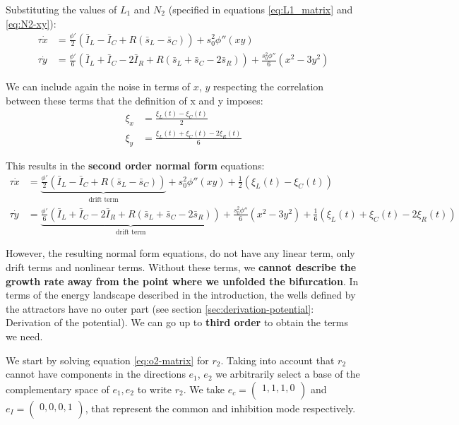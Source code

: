 \documentclass[../main.tex]{subfiles}
\begin{document}
Substituting the values of $L_1$ and $N_2$ (specified in equations \eqref{eq:L1_matrix} and \eqref{eq:N2-xy}): 
\begin{align*}
\tau \dot{x} &= \frac{\phi'}{2}(\bar{I}_L -  \bar{I}_C + R (\bar{s}_L - \bar{s}_C)) + s_0^2\phi''(xy)\\[8pt]
\tau \dot{y} &= \frac{\phi'}{6}(\bar{I}_L +  \bar{I}_C - 2 \bar{I}_R +  R (\bar{s}_L+ \bar{s}_C -2\bar{s}_R) ) + \frac{s_0^2\phi''}{6}(x^2-3y^2) 
\end{align*}

We can include again the noise in terms of $x$, $y$ respecting the correlation between these terms that the definition of x and y imposes:
\[\begin{aligned}
\xi_{x} &= \frac{\xi_{L}(t)-\xi_{C}(t)}{2}\\
\xi_{y} &= \frac{\xi_{L}(t)+\xi_{C}(t)-2\xi_{R}(t)}{6}
\end{aligned}
\]

This results in the \textbf{second order normal form} equations:
\begin{subequations}
\begin{align}
\tau \dot{x} &= \underbrace{\frac{\phi'}{2}(\bar{I}_L -  \bar{I}_C + R (\bar{s}_L - \bar{s}_C))}_{\text{drift term}} + s_0^2\phi''(xy) + \frac{1}{2}(\xi_L(t)-\xi_C(t)) \label{eq:system-o2-x}\\[8pt]
\tau \dot{y} &= \underbrace{\frac{\phi'}{6}(\bar{I}_L +  \bar{I}_C - 2 \bar{I}_R +  R (\bar{s}_L+ \bar{s}_C -2\bar{s}_R) )}_{\text{drift term}} + \frac{s_0^2\phi''}{6}(x^2-3y^2) + \frac{1}{6}(\xi_L(t)+\xi_C(t)-2\xi_R(t))\label{eq:system-o2-y}
\end{align}
\label{eq:system-o2}
\end{subequations}


However, the resulting normal form equations, do not have any linear term, only drift terms and nonlinear terms. Without these terms, we \textbf{cannot describe the growth rate away from the point where we unfolded the bifurcation}. In terms of the energy landscape described in the introduction, the wells defined by the attractors have no outer part (see section \ref{sec:derivation-potential}: Derivation of the potential). We can go up to \textbf{third order} to obtain the terms we need.

We start by solving equation \eqref{eq:o2-matrix} for $r_2$. Taking into account that $r_2$ cannot have components in the directions $e_1$, $e_2$ we arbitrarily select a base of the complementary space of $e_1,e_2$ to write $r_2$. We take $e_c = \begin{pmatrix}
1,1,1,0\\
\end{pmatrix}$ and $e_I = \begin{pmatrix}0,0,0,1\\\end{pmatrix}$, that represent the common and inhibition mode respectively. 
\end{document}
